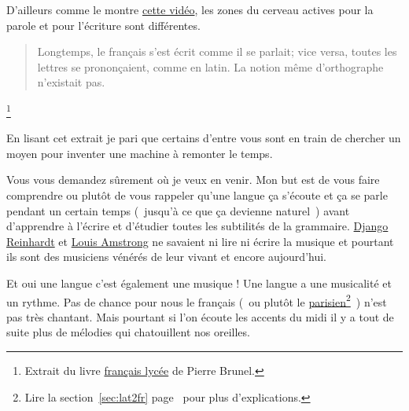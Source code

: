 D'ailleurs comme le montre \href{https://youtu.be/Wn\_eBrIDUuc}{cette vidéo}, les zones du cerveau actives
pour la parole et pour l'écriture sont différentes.\par

\begin{quote}
Longtemps, le français s'est écrit comme il se parlait; vice versa,
toutes les lettres se prononçaient, comme en latin. La notion même
d'orthographe n'existait pas.
\end{quote}\footnote{Extrait du livre
\href{https://www.amazon.fr/gp/product/2844100015/ref=as\_li\_tl?ie=UTF8\&camp=1642\&creative=6746\&creativeASIN=2844100015\&linkCode=as2\&tag=wwwbecomefree-21\&linkId=985f3a849fd44728e8480993cf2d5490}{français
  lycée} de Pierre Brunel.}


En lisant cet extrait je pari que certains d'entre vous sont en train
de chercher un moyen pour inventer une machine à remonter le temps. 

Vous vous demandez sûrement où je veux en venir. Mon but est de vous
faire comprendre ou plutôt de vous rappeler qu'une langue ça s'écoute
et ça se parle pendant un certain temps (~jusqu'à ce que ça devienne
naturel~) avant d'apprendre à l'écrire et d'étudier toutes les
subtilités de la grammaire. \href{https://fr.wikipedia.org/wiki/Django\_Reinhardt}{Django Reinhardt} et \href{https://fr.wikipedia.org/wiki/Louis\_Armstrong}{Louis Amstrong} ne
savaient ni lire ni écrire la musique et pourtant ils sont des
musiciens vénérés de leur vivant et encore aujourd'hui.\par

Et oui une langue c'est également une musique ! Une langue a une
musicalité et un rythme. Pas de chance pour nous le français (~ou
plutôt le \underline{parisien}\footnote{Lire la section~\ref{sec:lat2fr}
  page~\pageref{sec:lat2fr} pour plus d'explications.}~)
n'est pas très chantant. Mais pourtant si l'on écoute les accents du
midi il y a tout de suite plus de mélodies qui chatouillent nos
oreilles. 

